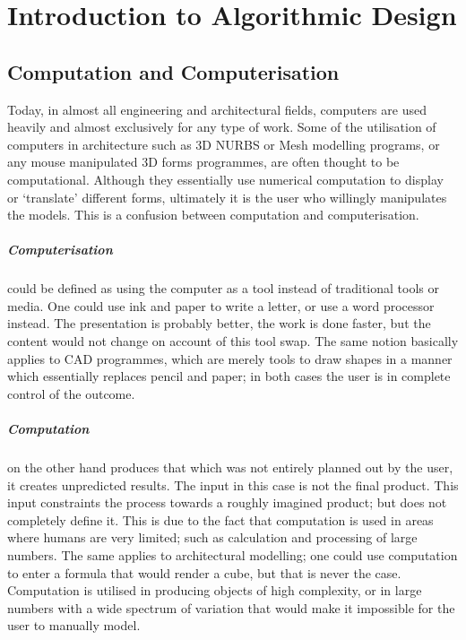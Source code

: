 \chapter{Introduction to Algorithmic Design}

\section{Computation and Computerisation}

Today, in almost all engineering and architectural fields, computers are used heavily and almost exclusively for any type of work. Some of the utilisation of computers in architecture such as 3D NURBS or Mesh modelling programs, or any mouse manipulated 3D forms programmes, are often thought to be computational. Although they essentially use numerical computation to display or `translate' \cite{terzidis06} different forms, ultimately it is the user who willingly manipulates the models.  This is a confusion between computation and computerisation. 

\paragraph{Computerisation}could be defined as using the computer as a tool instead of traditional tools or media. One could use ink and paper to write a letter, or use a word processor instead. The presentation is probably better, the work is done faster, but the content would not change on account of this tool swap. The same notion basically applies to CAD programmes, which are merely tools to draw shapes in a manner which essentially replaces pencil and paper; in both cases the user is in complete control of the outcome.

\paragraph{Computation}on the other hand produces that which was not entirely planned out by the user, it creates unpredicted results. The input in this case is not the final product. This input constraints the process towards a roughly imagined product; but does not completely define it. This is due to the fact that computation is used in areas where humans are very limited; such as calculation and processing of large numbers. The same applies to architectural modelling; one could use computation to enter a formula that would render a cube, but that is never the case. Computation is utilised in producing objects of high complexity, or in large numbers with a wide spectrum of variation that would make it impossible for the user to manually model.

